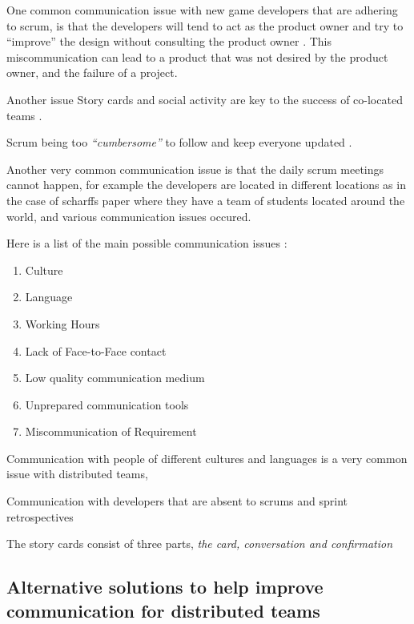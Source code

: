 \documentclass{scrartcl}
\begin{document}
One common communication issue with new game developers that are adhering to scrum, is that the developers will tend to act as the product owner and try to ``improve'' the design without consulting the product owner \cite{krasteva2008}. This miscommunication can lead to a product that was not desired by the product owner, and the failure of a project. \par

Another issue Story cards and social activity are key to the success of co-located teams \cite{abdullah2011}. \par

Scrum being too \textit{``cumbersome''} to follow and keep everyone updated \cite{scharff2012}. \par

Another very common communication issue is that the daily scrum meetings cannot happen, for example the developers are located in different locations as in the case of scharffs paper \cite{scharff2012} where they have a team of students located around the world, and various communication issues occured. 

Here is a list of the main possible communication issues \cite{joshi2013}: 


\begin{enumerate}
\item Culture
\item Language
\item Working Hours
\item Lack of Face-to-Face contact
\item Low quality communication medium
\item Unprepared communication tools
\item Miscommunication of Requirement
\end{enumerate}

Communication with people of different cultures and languages is a very common issue with distributed teams, \cite{cohn2003}

Communication with developers that are absent to scrums and sprint retrospectives \cite{scharff2012}

The story cards consist of three parts, \textit{the card, conversation and confirmation} \cite{abdullah2011}


\subsection{Alternative solutions to help improve communication for distributed teams}
\end{document}
